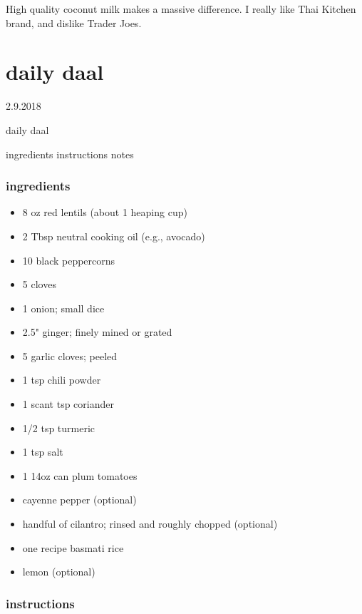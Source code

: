 \documentclass[]{book}
\providecommand{\tightlist}{%
  \setlength{\itemsep}{0pt}\setlength{\parskip}{0pt}}
\begin{document}
High quality coconut milk makes a massive difference. I really like Thai Kitchen brand, and dislike Trader Joes.

\hypertarget{daily-daal}{%
\chapter{daily daal}\label{daily-daal}}

2.9.2018

daily daal

ingredients \textbar{}
instructions \textbar{}
notes

\hypertarget{ingredients-24}{%
\subsection{ingredients}\label{ingredients-24}}

\begin{itemize}
\tightlist
\item
  8 oz red lentils (about 1 heaping cup)
\item
  2 Tbsp neutral cooking oil (e.g., avocado)
\item
  10 black peppercorns
\item
  5 cloves
\item
  1 onion; small dice
\item
  2.5" ginger; finely mined or grated
\item
  5 garlic cloves; peeled
\item
  1 tsp chili powder
\item
  1 scant tsp coriander
\item
  1/2 tsp turmeric
\item
  1 tsp salt
\item
  1 14oz can plum tomatoes
\item
  cayenne pepper (optional)
\item
  handful of cilantro; rinsed and roughly chopped (optional)
\item
  one recipe basmati rice
\item
  lemon (optional)
\end{itemize}

\hypertarget{instructions-24}{%
\subsection{instructions}\label{instructions-24}}
\end{document}
